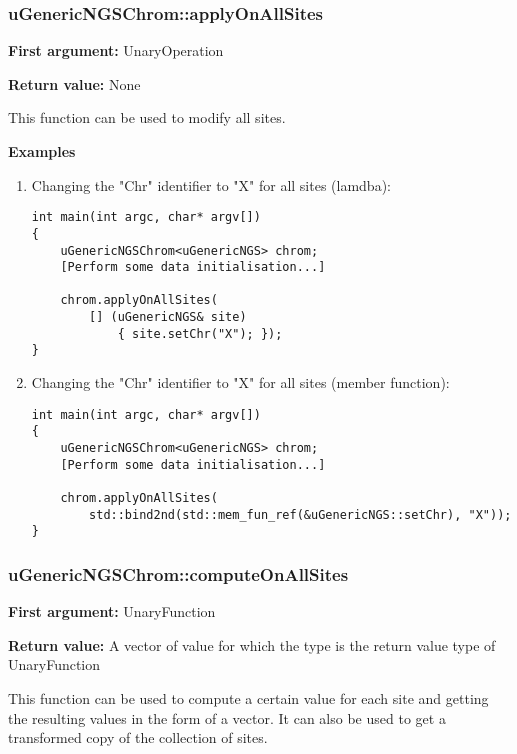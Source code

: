 \documentclass[letterpaper,10pt]{article}
\begin{document}
\subsubsection{uGenericNGSChrom::applyOnAllSites}
\textbf{First argument:} UnaryOperation

\noindent{}\textbf{Return value:} None

\bigskip
\noindent{}This function can be used to modify all sites.

\bigskip
\noindent{}\textbf{Examples}
\begin{enumerate}
 \item Changing the "Chr" identifier to "X" for all sites (lamdba):
\begin{verbatim}
int main(int argc, char* argv[])
{
    uGenericNGSChrom<uGenericNGS> chrom;
    [Perform some data initialisation...]

    chrom.applyOnAllSites(
        [] (uGenericNGS& site) 
            { site.setChr("X"); });
}
\end{verbatim}

\item Changing the "Chr" identifier to "X" for all sites (member function):
\begin{verbatim}
int main(int argc, char* argv[])
{
    uGenericNGSChrom<uGenericNGS> chrom;
    [Perform some data initialisation...]

    chrom.applyOnAllSites(
        std::bind2nd(std::mem_fun_ref(&uGenericNGS::setChr), "X"));
}
\end{verbatim}
\end{enumerate}

\subsubsection{uGenericNGSChrom::computeOnAllSites}
\textbf{First argument:} UnaryFunction

\noindent{}\textbf{Return value:} A vector of value for which the type is the return value type of UnaryFunction

\bigskip
\noindent{}This function can be used to compute a certain value for each site and getting the resulting values in the form of a vector. It can also be used to get a transformed copy of the collection of sites.
\end{document}
